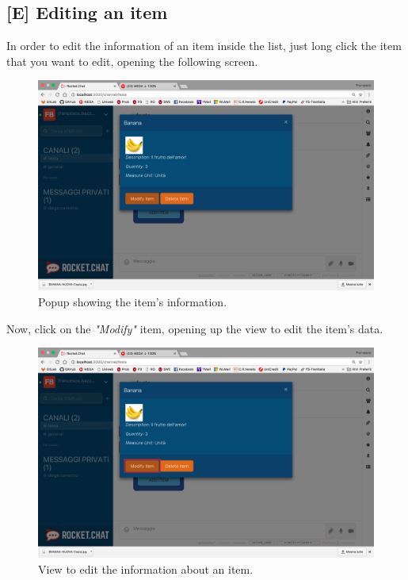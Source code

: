\subsection{[E] Editing an item}
In order to edit the information of an item inside the list, just long click the item that you want to edit, opening the following screen.

\begin{figure}[H]
  \centering 
  \includegraphics[width=\textwidth]{Sections/3-HowToUse/Images/item_details.png}
  \caption{Popup showing the item's information.}
\end{figure}

Now, click on the \textit{"Modify"} item, opening up the view to edit the item's data.

\begin{figure}[H]
  \centering 
  \includegraphics[width=\textwidth]{Sections/3-HowToUse/Images/popup_item_edit.png}
  \caption{View to edit the information about an item.}
\end{figure}

